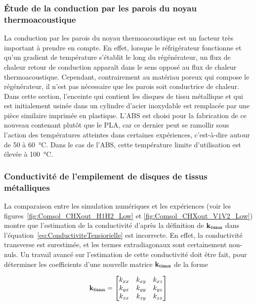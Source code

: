 \subsubsection{\'Etude de la conduction par les parois du noyau thermoacoustique}
La conduction par les parois du noyau thermoacoustique est un facteur très important à prendre en compte. En effet, lorsque le réfrigérateur fonctionne et qu'un gradient de température s'établit le long du régénérateur, un flux de chaleur \og retour \fg{} de conduction apparaît dans le sens opposé au flux de chaleur thermoacoustique. Cependant, contrairement au matériau poreux qui compose le régénérateur, il n'est pas nécessaire que les parois soit conductrice de chaleur. Dans cette section, l'enceinte qui contient les disques de tissu métallique et qui est initialement usinée dans un cylindre d'acier inoxydable est remplacée par une pièce similaire imprimée en plastique. L'ABS est choisi pour la fabrication de ce nouveau contenant plutôt que le PLA, car ce dernier peut se ramollir sous l'action des températures atteintes dans certaines expériences, c'est-à-dire autour de \num{50} à \qty{60}{\degreeCelsius}. Dans le cas de l'ABS, cette température limite d'utilisation est élevée à \qty{100}{\degreeCelsius}.

\subsubsection{Conductivité de l'empilement de disques de tissus métalliques}
La comparaison entre les simulation numériques et les expériences (voir les figures~\ref{fig:Comsol_CHXout_H1H2_Low} et \ref{fig:Comsol_CHXout_V1V2_Low}) montre que l'estimation de la conductivité d'après la définition de $\mathbf k_{\sf tissus}$ dans l'équation~\eqref{eq:ConductiviteTensiorielle} est incorrecte. En effet, la conductivité transverse est surestimée, et les termes extradiagonaux sont certainement non-nuls. Un travail avancé sur l'estimation de cette conductivité doit être fait, pour déterminer les coefficients d'une nouvelle matrice $\mathbf k_{\sf tissus}$ de la forme

\begin{equation}
	\mathbf k_{\sf tissus} = \begin{bmatrix}
	k_{xx} & k_{xy} & k_{xz} \\
	k_{yx} & k_{yy} & k_{yz} \\
	k_{zx} & k_{zy} & k_{zz} 
	\end{bmatrix}
	\label{eq:ConductiviteTensorielle_FullAnisot}
\end{equation}



